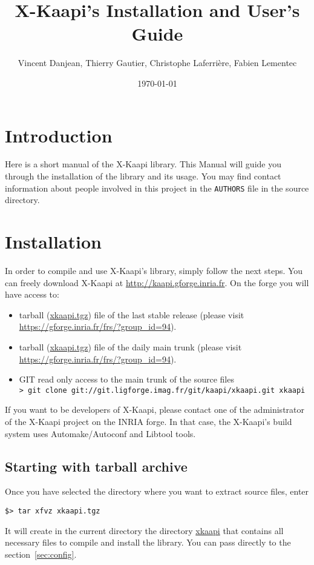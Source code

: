 \documentclass{article}
\newcommand{\kaapi}{\textsc{X}-Kaapi\xspace}
\begin{document}
\title{X-Kaapi's Installation and User's Guide}
\author{Vincent Danjean, Thierry Gautier, Christophe Laferrière, Fabien Lementec}
\date{\today}
\maketitle
\tableofcontents
\newpage

\section{Introduction}

Here is a short manual of the \kaapi library. This Manual will guide you through the installation of the library and its usage.
You may find contact information about people involved in this project in the \verb+AUTHORS+ file in the source directory.

\section{Installation}

In order to compile and use \kaapi's library, simply follow the next steps.
You can freely download \kaapi at \url{http://kaapi.gforge.inria.fr}. 
On the forge you will have access to:
\begin{itemize}
\item tarball (\url{xkaapi.tgz}) file of the last stable release
(please visit \url{https://gforge.inria.fr/frs/?group_id=94}).
\item tarball (\url{xkaapi.tgz}) file of the daily main trunk
(please visit \url{https://gforge.inria.fr/frs/?group_id=94}).
\item GIT read only access to the main trunk of the source files\\
\verb+> git clone git://git.ligforge.imag.fr/git/kaapi/xkaapi.git xkaapi+
\end{itemize}
If you want to be developers of \kaapi, please contact one of the administrator of the \kaapi project on the INRIA forge.
In that case, the \kaapi 's build system uses Automake/Autoconf and Libtool tools. 

\subsection{Starting with tarball archive}
Once you have selected the directory where you want to extract source files, enter
\begin{verbatim}
$> tar xfvz xkaapi.tgz 
\end{verbatim}
It will create in the current directory the directory \url{xkaapi} that contains all necessary files to compile and install the library. You can pass directly to the section~\ref{sec:config}.
\end{document}
